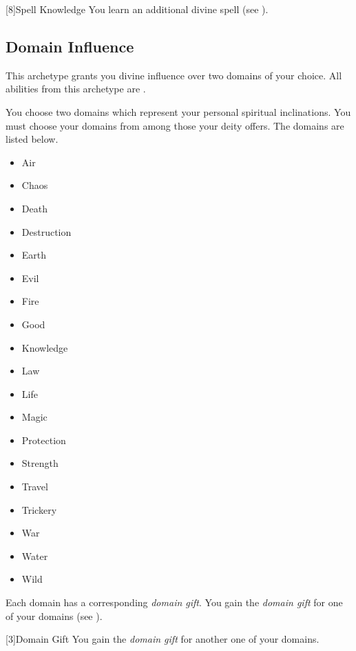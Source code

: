         [8]{Spell Knowledge}
        You learn an additional divine spell (see ).

    \subsection{Domain Influence}
        This archetype grants you divine influence over two domains of your choice.
        All abilities from this archetype are .

        You choose two domains which represent your personal spiritual inclinations.
        You must choose your domains from among those your deity offers.
        The domains are listed below.

        \begin{itemize}
            \item{Air}
            \item{Chaos}
            \item{Death}
            \item{Destruction}
            \item{Earth}
            \item{Evil}
            \item{Fire}
            \item{Good}
            \item{Knowledge}
            \item{Law}
            \item{Life}
            \item{Magic}
            \item{Protection}
            \item{Strength}
            \item{Travel}
            \item{Trickery}
            \item{War}
            \item{Water}
            \item{Wild}
        \end{itemize}

        Each domain has a corresponding \textit{domain gift}.
        You gain the \textit{domain gift} for one of your domains (see ).

        [3]{Domain Gift}
        You gain the \textit{domain gift} for another one of your domains.

